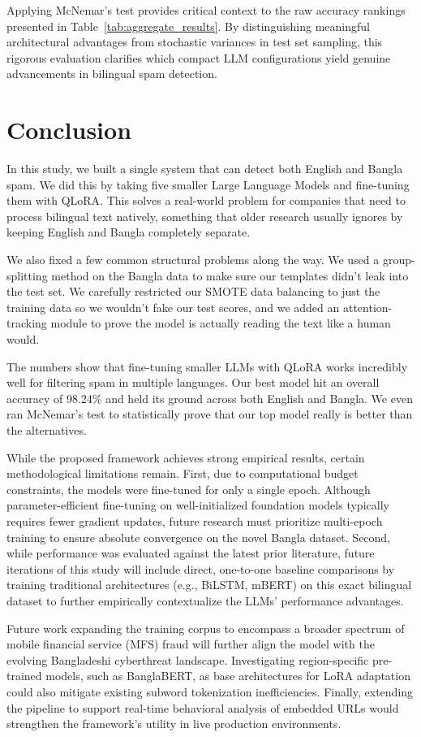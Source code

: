 \documentclass[journal]{IEEEtran}
\begin{document}
Applying McNemar's test provides critical context to the raw accuracy rankings presented in Table~\ref{tab:aggregate_results}. By distinguishing meaningful architectural advantages from stochastic variances in test set sampling, this rigorous evaluation clarifies which compact LLM configurations yield genuine advancements in bilingual spam detection.

\balance
\section{Conclusion}

In this study, we built a single system that can detect both English and Bangla spam. We did this by taking five smaller Large Language Models and fine-tuning them with QLoRA. This solves a real-world problem for companies that need to process bilingual text natively, something that older research usually ignores by keeping English and Bangla completely separate.

We also fixed a few common structural problems along the way. We used a group-splitting method on the Bangla data to make sure our templates didn't leak into the test set. We carefully restricted our SMOTE data balancing to just the training data so we wouldn't fake our test scores, and we added an attention-tracking module to prove the model is actually reading the text like a human would.

The numbers show that fine-tuning smaller LLMs with QLoRA works incredibly well for filtering spam in multiple languages. Our best model hit an overall accuracy of 98.24\% and held its ground across both English and Bangla. We even ran McNemar's test to statistically prove that our top model really is better than the alternatives.

While the proposed framework achieves strong empirical results, certain methodological limitations remain. First, due to computational budget constraints, the models were fine-tuned for only a single epoch. Although parameter-efficient fine-tuning on well-initialized foundation models typically requires fewer gradient updates, future research must prioritize multi-epoch training to ensure absolute convergence on the novel Bangla dataset. Second, while performance was evaluated against the latest prior literature, future iterations of this study will include direct, one-to-one baseline comparisons by training traditional architectures (e.g., BiLSTM, mBERT) on this exact bilingual dataset to further empirically contextualize the LLMs' performance advantages.

Future work expanding the training corpus to encompass a broader spectrum of mobile financial service (MFS) fraud will further align the model with the evolving Bangladeshi cyberthreat landscape. Investigating region-specific pre-trained models, such as BanglaBERT, as base architectures for LoRA adaptation could also mitigate existing subword tokenization inefficiencies. Finally, extending the pipeline to support real-time behavioral analysis of embedded URLs would strengthen the framework's utility in live production environments.






\end{document}
